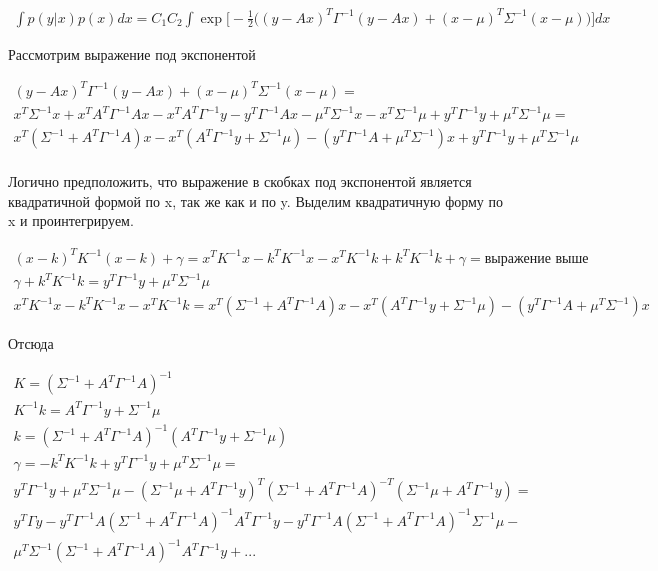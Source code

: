 \begin{gather*}
\int p(y|x)p(x)dx = C_1 C_2 \int \exp \bigg[ -\frac{1}{2} \Big(
(y-Ax)^T \Gamma^{-1} (y-Ax) + (x-\mu)^T \Sigma^{-1} (x-\mu)
\Big) \bigg] dx
\end{gather*}

Рассмотрим выражение под экспонентой

\begin{gather*}
	(y-Ax)^T \Gamma^{-1} (y-Ax) + (x-\mu)^T \Sigma^{-1} (x-\mu) = \\
	x^T \Sigma^{-1} x + x^TA^T \Gamma^{-1} Ax - x^T A^T \Gamma^{-1} y - y^T \Gamma^{-1} A x - \mu^T \Sigma^{-1} x - x^T \Sigma^{-1} \mu + y^T \Gamma^{-1} y + \mu^T \Sigma^{-1} \mu = \\
	x^T (\Sigma^{-1} + A^T \Gamma^{-1} A) x - x^T ( A^T \Gamma^{-1} y + \Sigma^{-1} \mu ) - (y^T \Gamma^{-1} A + \mu^T \Sigma^{-1}) x + y^T \Gamma^{-1} y + \mu^T \Sigma^{-1} \mu \\
\end{gather*}

Логично предположить, что выражение в скобках под экспонентой является квадратичной формой по x, так же как и по y. Выделим квадратичную форму по x и проинтегрируем.

\begin{gather*}
	(x-k)^T K^{-1} (x-k) + \gamma = x^T K^{-1} x - k^T K^{-1} x - x^T K^{-1} k + k^T K^{-1} k + \gamma = \text{выражение выше} \\
	\gamma + k^T K^{-1} k = y^T \Gamma^{-1} y + \mu^T \Sigma^{-1} \mu \\
	x^T K^{-1} x - k^T K^{-1} x - x^T K^{-1} k = x^T (\Sigma^{-1} + A^T \Gamma^{-1} A) x - x^T ( A^T \Gamma^{-1} y + \Sigma^{-1} \mu ) - (y^T \Gamma^{-1} A + \mu^T \Sigma^{-1}) x
\end{gather*}

Отсюда

\begin{gather*}
	K = (\Sigma^{-1} + A^T \Gamma^{-1} A )^{-1} \\
	K^{-1} k = A^T \Gamma^{-1} y + \Sigma^{-1} \mu \\
	k =  (\Sigma^{-1} + A^T \Gamma^{-1} A )^{-1} (A^T \Gamma^{-1} y + \Sigma^{-1} \mu) \\
	\gamma = - k^T K^{-1} k + y^T \Gamma^{-1} y + \mu^T \Sigma^{-1} \mu = \\
	y^T \Gamma^{-1} y + \mu^T \Sigma^{-1} \mu - (\Sigma^{-1} \mu + A^T \Gamma^{-1} y)^T (\Sigma^{-1} + A^T \Gamma^{-1} A)^{-T} (\Sigma^{-1} \mu + A^T \Gamma^{-1} y) = \\
	y^T \Gamma y - y^T \Gamma^{-1} A (\Sigma^{-1} + A^T \Gamma^{-1} A)^{-1} A^T \Gamma^{-1} y - y^T \Gamma^{-1} A (\Sigma^{-1}+A^T\Gamma^{-1}A)^{-1} \Sigma^{-1} \mu - \\ 
	\mu^T \Sigma^{-1} (\Sigma^{-1}+A^T \Gamma^{-1}A)^{-1}A^T \Gamma^{-1} y + ...
\end{gather*}

